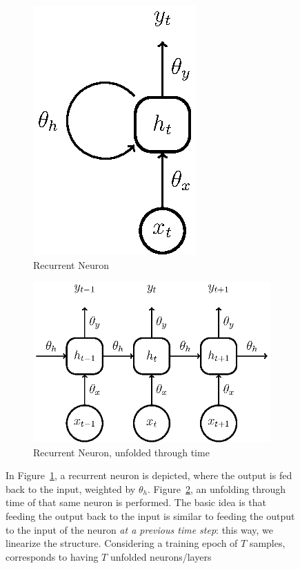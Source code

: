 \begin{figure}[H]
	\begin{subfigure}{0.5\linewidth}
		\centering
		\includegraphics[width=0.34\linewidth]{figures/recneuron.eps}
		\caption{Recurrent Neuron}
		\label{fig:recneuron}
	\end{subfigure}
	\begin{subfigure}{0.5\linewidth}
		\centering
		\includegraphics[width=0.9\linewidth]{figures/recneuron_unf.eps}
		\caption{Recurrent Neuron, unfolded through time}
		\label{fig:recneuron_unf}
	\end{subfigure}
		
    \caption[Representation of a Recurrent Neuron (Figure~\ref{fig:recneuron}) and a Recurrent Neuron unfolded through time (Figure~\ref{fig:recneuron_unf})]{In Figure~\ref{fig:recneuron}, a recurrent neuron is depicted, where the output is fed back to the input, weighted by $\theta_h$. Figure~\ref{fig:recneuron_unf}, an unfolding through time of that same neuron is performed. The basic idea is that feeding the output back to the input is similar to feeding the output to the input of the neuron \emph{at a previous time step}: this way, we linearize the structure. Considering a training epoch of $T$ samples, corresponds to having $T$ unfolded neurons/layers}
	\label{fig:recurrneuron}
\end{figure}

